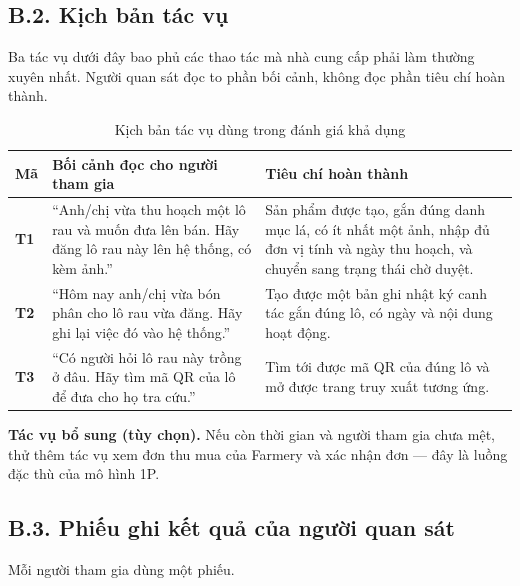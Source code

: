 \subsection*{B.2. Kịch bản tác vụ}

Ba tác vụ dưới đây bao phủ các thao tác mà nhà cung cấp phải làm thường xuyên
nhất. Người quan sát đọc to phần bối cảnh, không đọc phần tiêu chí hoàn thành.

\begingroup
\tblsetup\tblzebra
\begin{table}[H]
\centering
\small
\caption{Kịch bản tác vụ dùng trong đánh giá khả dụng}
\label{tab:kichban-khaosat}
\begin{tabular}{L{1.16cm} L{6.76cm} L{6.98cm}}
\toprule
{}
\textbf{Mã} & \textbf{Bối cảnh đọc cho người tham gia} & \textbf{Tiêu chí hoàn thành} \\
\midrule
\textbf{T1} & ``Anh/chị vừa thu hoạch một lô rau và muốn đưa lên bán. Hãy đăng lô rau này lên hệ thống, có kèm ảnh.'' & Sản phẩm được tạo, gắn đúng danh mục lá, có ít nhất một ảnh, nhập đủ đơn vị tính và ngày thu hoạch, và chuyển sang trạng thái chờ duyệt. \\
\textbf{T2} & ``Hôm nay anh/chị vừa bón phân cho lô rau vừa đăng. Hãy ghi lại việc đó vào hệ thống.'' & Tạo được một bản ghi nhật ký canh tác gắn đúng lô, có ngày và nội dung hoạt động. \\
\textbf{T3} & ``Có người hỏi lô rau này trồng ở đâu. Hãy tìm mã QR của lô để đưa cho họ tra cứu.'' & Tìm tới được mã QR của đúng lô và mở được trang truy xuất tương ứng. \\
\bottomrule
\end{tabular}
\end{table}
\endgroup

\noindent\textbf{Tác vụ bổ sung (tùy chọn).} Nếu còn thời gian và người tham
gia chưa mệt, thử thêm tác vụ xem đơn thu mua của Farmery và xác nhận đơn ---
đây là luồng đặc thù của mô hình 1P.

\subsection*{B.3. Phiếu ghi kết quả của người quan sát}

Mỗi người tham gia dùng một phiếu.

